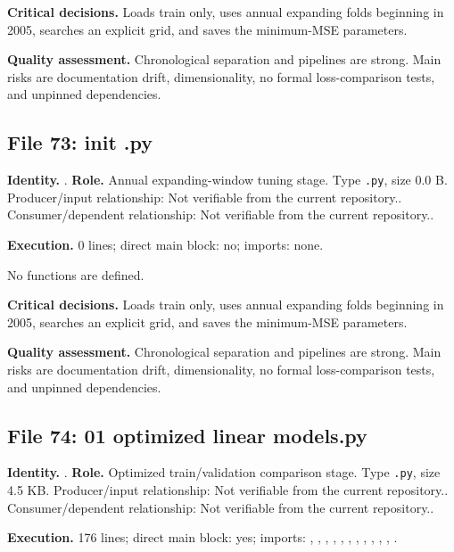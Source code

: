 \documentclass[
  11pt,
  a4paper]{article}
\newcounter{none} %
\begin{document}
\textbf{Critical decisions.} Loads train only, uses annual expanding
folds beginning in 2005, searches an explicit grid, and saves the
minimum-MSE parameters.

\textbf{Quality assessment.} Chronological separation and pipelines are
strong. Main risks are documentation drift, dimensionality, no formal
loss-comparison tests, and unpinned dependencies.

\subsection{File 73: init .py}\label{file-2563026066990470548}

\textbf{Identity.} .
\textbf{Role.} Annual expanding-window tuning stage. Type \texttt{.py},
size 0.0 B. Producer/input relationship: Not verifiable from the current
repository.. Consumer/dependent relationship: Not verifiable from the
current repository..

\textbf{Execution.} 0 lines; direct main block: no; imports: none.

No functions are defined.

\textbf{Critical decisions.} Loads train only, uses annual expanding
folds beginning in 2005, searches an explicit grid, and saves the
minimum-MSE parameters.

\textbf{Quality assessment.} Chronological separation and pipelines are
strong. Main risks are documentation drift, dimensionality, no formal
loss-comparison tests, and unpinned dependencies.

\subsection{File 74: 01 optimized linear
models.py}\label{file-8703164404580626420}

\textbf{Identity.}
.
\textbf{Role.} Optimized train/validation comparison stage. Type
\texttt{.py}, size 4.5 KB. Producer/input relationship: Not verifiable
from the current repository.. Consumer/dependent relationship: Not
verifiable from the current repository..

\textbf{Execution.} 176 lines; direct main block: yes; imports:
, , ,
,
,
,
,
,
,
,
, .
\end{document}
